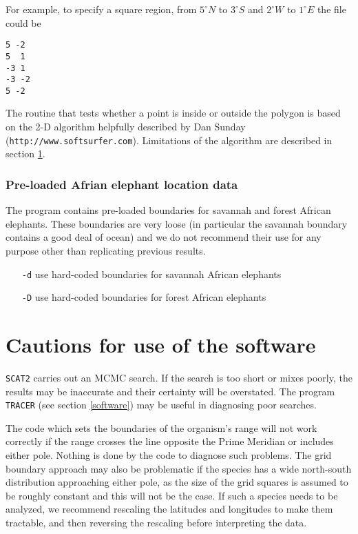 \documentclass[10pt,titlepage,times,letterpaper]{article}
\def\SCAT{{\tt SCAT2} }
\begin{document}
For example, to specify a square region, from $5^\circ N$ to $3^\circ S$ and
$2^\circ W$ to $1^\circ E$ the file could be
\begin{verbatim}
5 -2
5  1
-3 1
-3 -2
5 -2
\end{verbatim}

The routine that tests whether a point is inside or outside the polygon
is based on the 2-D algorithm helpfully
described by Dan Sunday ({\tt http://www.softsurfer.com}). 
Limitations of the algorithm are described in section \ref{cautions}.

\subsubsection{Pre-loaded Afrian elephant location data}

The program contains pre-loaded boundaries for savannah and forest 
African elephants.  These boundaries are very loose (in particular
the savannah boundary contains a good deal of ocean) and we do not
recommend their use for any purpose other than replicating previous
results.

\begin{itemize}
\item[{\tt -d}] use hard-coded boundaries for savannah African elephants
\item[{\tt -D}] use hard-coded boundaries for forest African elephants
\end{itemize}


\section{Cautions for use of the software} \label{cautions}

\SCAT carries out an MCMC search.  If the search is too short or mixes
poorly, the results may be inaccurate and their certainty will be overstated.  The program
{\tt TRACER} (see section \ref{software}) may be useful in diagnosing poor
searches.

The code which sets the boundaries of the organism's range
will not work correctly if the range crosses the line opposite
the Prime Meridian or includes either pole.  Nothing is done by the code to
diagnose such problems.  
The grid boundary approach may also be problematic if the species has a wide
north-south distribution approaching either pole, as the size of the grid 
squares is assumed to be roughly constant and this will not be the case.
If such a species needs to be analyzed, we recommend rescaling the latitudes and
longitudes to make them tractable, and then reversing the rescaling before
interpreting the data.  
\end{document}
